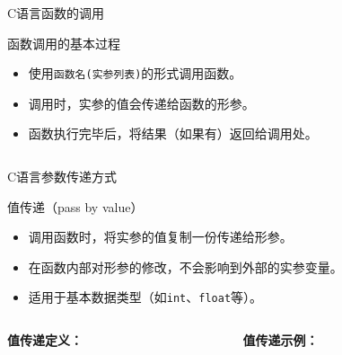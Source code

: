 \documentclass[UTF8,aspectratio=169]{beamer}
\begin{document}
\begin{frame}{C语言函数的调用}
    \begin{ytublock}{函数调用的基本过程}
        \begin{itemize}
            \item 使用\texttt{函数名(实参列表)}的形式调用函数。
            \item 调用时，实参的值会传递给函数的形参。
            \item 函数执行完毕后，将结果（如果有）返回给调用处。
        \end{itemize}
    \end{ytublock}
    \inputminted[firstline=11,lastline=12]{cpp}{code/c_function_simple.c}
\end{frame}

\begin{frame}{C语言参数传递方式}
    \begin{ytublock}{值传递（pass by value）}
        \begin{itemize}
            \item 调用函数时，将实参的值复制一份传递给形参。
            \item 在函数内部对形参的修改，不会影响到外部的实参变量。
            \item 适用于基本数据类型（如\texttt{int}、\texttt{float}等）。
        \end{itemize}
        \begin{columns}
            \begin{column}{0.48\textwidth}
                \textbf{值传递定义：}
                \inputminted[firstline=12,lastline=15]{cpp}{code/c_function_example.c}
            \end{column}
            \begin{column}{0.48\textwidth}
                \textbf{值传递示例：}
                \inputminted[firstline=46,lastline=47]{cpp}{code/c_function_example.c}
            \end{column}
        \end{columns}
    \end{ytublock}
\end{frame}
\end{document}
